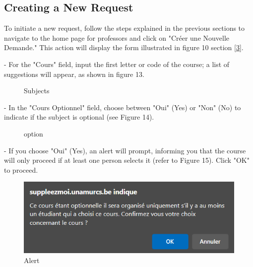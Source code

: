 \documentclass[12pt]{article}
\begin{document}
\subsection{Creating a New Request}

To initiate a new request, follow the steps explained in  the previous sections to navigate to the home page for professors and click on "Créer une Nouvelle Demande." This action will display the form illustrated in figure 10 section \textcolor{blue}{\ref{3}}.

- For the "Cours" field, input the first letter or code of the course; a list of suggestions will appear, as shown in figure 13.
\begin{figure}[H]
    \centering
    \caption{Subjects}
\end{figure}
- In the "Cours Optionnel" field, choose between "Oui" (Yes) or "Non" (No) to indicate if the subject is optional (see Figure 14).
\begin{figure}[H]
    \centering
    \caption{option}
\end{figure}
- If you choose "Oui" (Yes), an alert will prompt, informing you that the course will only proceed if at least one person selects it (refer to Figure 15). Click "OK" to proceed.
\begin{figure}[H]
    \centering
    \includegraphics[width=0.75\linewidth]{image15.png}
    \caption{Alert}
\end{figure}
\end{document}
